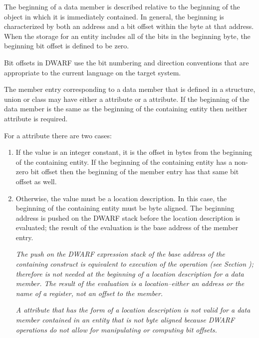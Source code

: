 The beginning of a data member is described relative to
the beginning of the object in which it is immediately
contained. In general, the beginning is characterized by
both an address and a bit offset within the byte at that
address. When the storage for an entity includes all of
the bits in the beginning byte, the beginning bit offset is
defined to be zero.

Bit offsets in DWARF use the bit numbering and direction
conventions that are appropriate to the current language on
the target system.

The member entry corresponding to a data member that is
defined in a structure, union or class may have either a
 attribute or a 
attribute. If the beginning of the data member is the same as
the beginning of the containing entity then neither attribute
is required.

For a  attribute there are two cases:

\begin{enumerate}[1.]

\item If the value is an integer constant, it is the offset
in bytes from the beginning of the containing entity. If
the beginning of the containing entity has a non-zero bit
offset then the beginning of the member entry has that same
bit offset as well.

\item Otherwise, the value must be a location description. In
this case, the beginning of the containing entity must be byte
aligned. The beginning address is pushed on the DWARF stack
before the location description is evaluated; the result of
the evaluation is the base address of the member entry.

\textit{The push on the DWARF expression stack of the base address of
the containing construct is equivalent to execution of the
 operation 
(see Section );
 therefore is not needed at the
beginning of a location description for a data member. The
result of the evaluation is a location--either an address or
the name of a register, not an offset to the member.}

\textit{A  attribute that has the form of a
location description is not valid for a data member contained
in an entity that is not byte aligned because DWARF operations
do not allow for manipulating or computing bit offsets.}

\end{enumerate}

